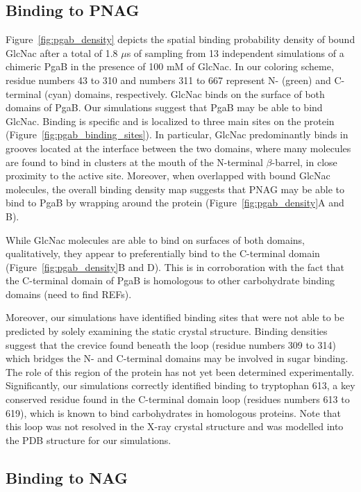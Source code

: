 \subsection{Binding to PNAG}
Figure~\ref{fig:pgab_density} depicts the spatial binding probability density of bound GlcNac after a total of 1.8 $\mu$s of sampling from 13 independent simulations of a chimeric PgaB in the presence of 100 mM of GlcNac. In our coloring scheme, residue numbers 43 to 310 and numbers 311 to 667 represent N- (green) and C-terminal (cyan) domains, respectively. GlcNac binds on the surface of both domains of PgaB. Our simulations suggest that PgaB may be able to bind GlcNac. Binding is specific and is localized to three main sites on the protein (Figure~\ref{fig:pgab_binding_sites}). In particular, GlcNac predominantly binds in grooves located at the interface between the two domains, where many molecules are found to bind in clusters at the mouth of the N-terminal $\beta$-barrel, in close proximity to the active site.  Moreover, when overlapped with bound GlcNac molecules, the overall binding density map suggests that PNAG may be able to bind to PgaB by wrapping around the protein (Figure~\ref{fig:pgab_density}A and B).

While GlcNac molecules are able to bind on surfaces of both domains, qualitatively, they appear to preferentially bind to the C-terminal domain (Figure~\ref{fig:pgab_density}B and D). This is in corroboration with the fact that the C-terminal domain of PgaB is homologous to other carbohydrate binding domains (need to find REFs).

Moreover, our simulations have identified binding sites that were not able to be predicted by solely examining the static crystal structure. Binding densities suggest that the crevice found beneath the loop (residue numbers 309 to 314) which bridges the N- and C-terminal domains may be involved in sugar binding. The role of this region of the protein has not yet been determined experimentally. Significantly, our simulations correctly identified binding to tryptophan 613, a key conserved residue found in the C-terminal domain loop (residues numbers 613 to 619), which is known to bind carbohydrates in homologous proteins. Note that this loop was not resolved in the X-ray crystal structure and was modelled into the PDB structure for our simulations.

\subsection{Binding to NAG}

